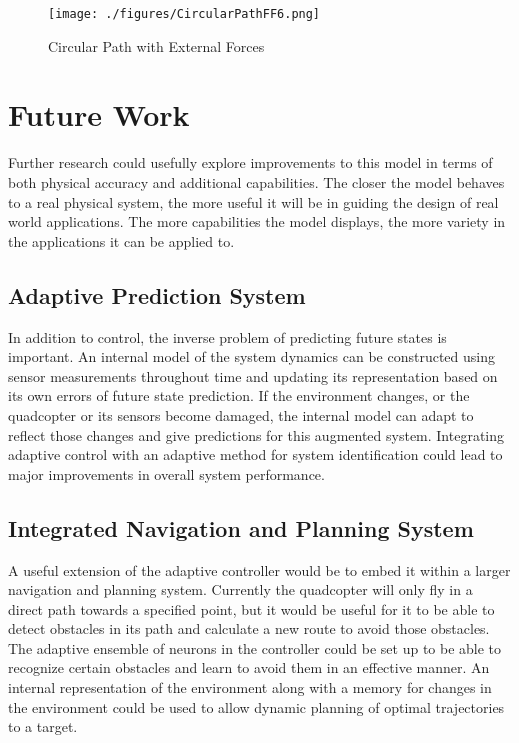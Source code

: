 \documentclass[letterpaper,12pt,titlepage,oneside,final]{book}
\begin{document}
\begin{figure}
\centering
\texttt{[image: ./figures/CircularPathFF6.png]}
\caption{Circular Path with External Forces}
\label{fig:circular_path_ff6}
\end{figure}


\section{Future Work}

Further research could usefully explore improvements to this model in terms of both physical accuracy and additional capabilities.
The closer the model behaves to a real physical system, the more useful it will be in guiding the design of real world applications.
The more capabilities the model displays, the more variety in the applications it can be applied to.

\subsection{Adaptive Prediction System}

In addition to control, the inverse problem of predicting future states is important.
An internal model of the system dynamics can be constructed using sensor measurements throughout time and updating its representation based on its own errors of future state prediction.
If the environment changes, or the quadcopter or its sensors become damaged, the internal model can adapt to reflect those changes and give predictions for this augmented system.
Integrating adaptive control with an adaptive method for system identification could lead to major improvements in overall system performance.


\subsection{Integrated Navigation and Planning System}

A useful extension of the adaptive controller would be to embed it within a larger navigation and planning system.
Currently the quadcopter will only fly in a direct path towards a specified point, but it would be useful for it to be able to detect obstacles in its path and calculate a new route to avoid those obstacles.
The adaptive ensemble of neurons in the controller could be set up to be able to recognize certain obstacles and learn to avoid them in an effective manner.
An internal representation of the environment along with a memory for changes in the environment could be used to allow dynamic planning of optimal trajectories to a target.
\end{document}
